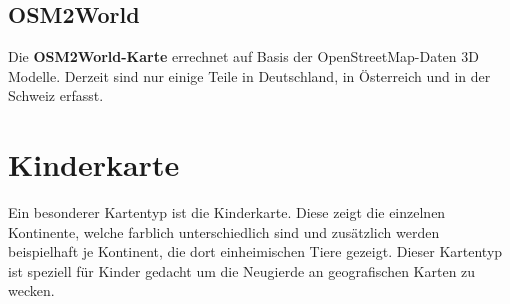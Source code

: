 \documentclass[10pt]{scrreprt}
\begin{document}
\vspace{3mm}
\begin{figure}[!htb]
	\centering
    \hspace{5mm}
\end{figure} 



\subsection{OSM2World}  
Die \textbf{OSM2World-Karte} errechnet auf Basis der OpenStreetMap-Daten 3D Modelle. Derzeit sind nur einige Teile in Deutschland, in Österreich und in der Schweiz erfasst.



\section{Kinderkarte}  
Ein besonderer Kartentyp ist die Kinderkarte. Diese zeigt die einzelnen Kontinente, welche farblich unterschiedlich sind und zusätzlich werden beispielhaft je Kontinent, die dort einheimischen Tiere gezeigt. Dieser Kartentyp ist speziell für Kinder gedacht um die Neugierde an geografischen Karten zu wecken.
\end{document}
